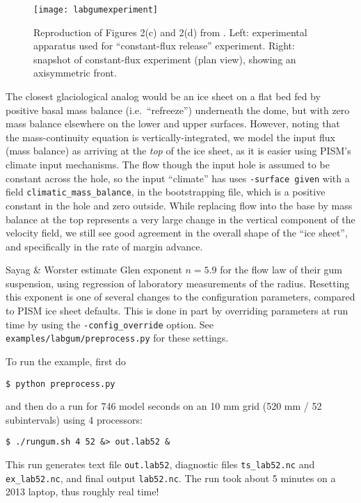 \begin{figure}[ht]
\centering
\texttt{[image: labgumexperiment]}
\caption{Reproduction of Figures 2(c) and 2(d) from \cite{SayagWorster2013}.  Left: experimental  apparatus used for ``constant-flux release'' experiment.  Right: snapshot of constant-flux experiment (plan view), showing an axisymmetric front.}
\label{fig:labgumexperiment}
\end{figure}

The closest glaciological analog would be an ice sheet on a flat bed fed by positive basal mass balance (i.e.~``refreeze'') underneath the dome, but with zero mass balance elsewhere on the lower and upper surfaces.  However, noting that the mass-continuity equation is vertically-integrated, we model the input flux (mass balance) as arriving at the \emph{top} of the ice sheet, as it is easier using PISM's climate input mechanisms.  The flow though the input hole is assumed to be constant across the hole, so the input ``climate'' has uses \texttt{-surface given} with a field \texttt{climatic_mass_balance}, in the bootstrapping file, which is a positive constant in the hole and zero outside.  While replacing flow into the base by mass balance at the top represents a very large change in the vertical component of the velocity field, we still see good agreement in the overall shape of the ``ice sheet'', and specifically in the rate of margin advance.

Sayag \& Worster estimate Glen exponent $n = 5.9$ for the flow law of their gum suspension, using regression of laboratory measurements of the radius.  Resetting this exponent is one of several changes to the configuration parameters, compared to PISM ice sheet defaults.  This is done in part by overriding parameters at run time by using the \texttt{-config_override} option.  See \texttt{examples/labgum/preprocess.py} for these settings.

To run the example, first do
\begin{verbatim}
$ python preprocess.py
\end{verbatim}
and then do a run for 746 model seconds \cite{SayagWorster2013} on an 10 mm grid (520 mm / 52 subintervals) using 4 processors:
\begin{verbatim}
$ ./rungum.sh 4 52 &> out.lab52 &
\end{verbatim}
This run generates text file \texttt{out.lab52}, diagnostic files \texttt{ts_lab52.nc} and \texttt{ex_lab52.nc}, and final output \texttt{lab52.nc}.  The run took about 5 minutes on a 2013 laptop, thus roughly real time!

